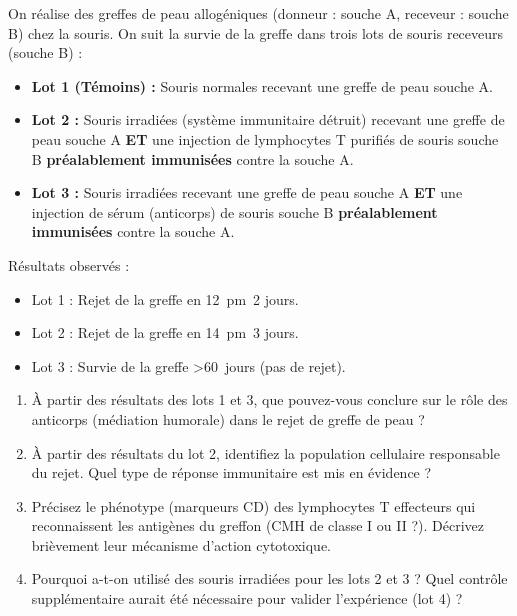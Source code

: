 \documentclass[11pt]{article}
\begin{document}
\begin{exercice}
On réalise des greffes de peau allogéniques (donneur : souche A, receveur : souche B) chez la souris. On suit la survie de la greffe dans trois lots de souris receveurs (souche B) :
\begin{itemize}
    \item \textbf{Lot 1 (Témoins) :} Souris normales recevant une greffe de peau souche A.
    \item \textbf{Lot 2 :} Souris irradiées (système immunitaire détruit) recevant une greffe de peau souche A \textbf{ET} une injection de lymphocytes T purifiés de souris souche B \textbf{préalablement immunisées} contre la souche A.
    \item \textbf{Lot 3 :} Souris irradiées recevant une greffe de peau souche A \textbf{ET} une injection de sérum (anticorps) de souris souche B \textbf{préalablement immunisées} contre la souche A.
\end{itemize}
Résultats observés :
\begin{itemize}
    \item Lot 1 : Rejet de la greffe en \SI{12}{\pm 2} jours.
    \item Lot 2 : Rejet de la greffe en \SI{14}{\pm 3} jours.
    \item Lot 3 : Survie de la greffe \textgreater \SI{60}{jours} (pas de rejet).
\end{itemize}
\begin{enumerate}
    \item À partir des résultats des lots 1 et 3, que pouvez-vous conclure sur le rôle des anticorps (médiation humorale) dans le rejet de greffe de peau ?
    \item À partir des résultats du lot 2, identifiez la population cellulaire responsable du rejet. Quel type de réponse immunitaire est mis en évidence ?
    \item Précisez le phénotype (marqueurs CD) des lymphocytes T effecteurs qui reconnaissent les antigènes du greffon (CMH de classe I ou II ?). Décrivez brièvement leur mécanisme d'action cytotoxique.
    \item Pourquoi a-t-on utilisé des souris irradiées pour les lots 2 et 3 ? Quel contrôle supplémentaire aurait été nécessaire pour valider l'expérience (lot 4) ?
\end{enumerate}
\end{exercice}
\end{document}
